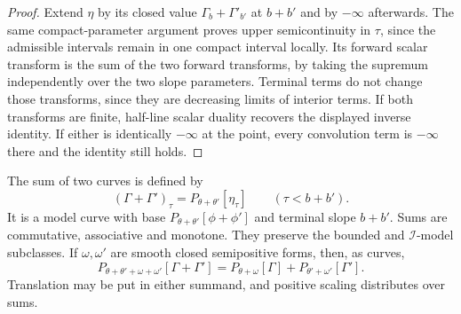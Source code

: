 \begin{proof}
Extend $\eta$ by its closed value $\Gamma_b+\Gamma'_{b'}$ at $b+b'$ and by $-\infty$ afterwards. The same compact-parameter argument proves upper semicontinuity in $\tau$, since the admissible intervals remain in one compact interval locally. Its forward scalar transform is the sum of the two forward transforms, by taking the supremum independently over the two slope parameters. Terminal terms do not change those transforms, since they are decreasing limits of interior terms. If both transforms are finite, half-line scalar duality recovers the displayed inverse identity. If either is identically $-\infty$ at the point, every convolution term is $-\infty$ there and the identity still holds.
\end{proof}

\begin{theorem}\label{thm:test-curve-sum}
The sum of two curves is defined by
\[
 (\Gamma+\Gamma')_\tau=P_{\theta+\theta'}[\eta_\tau]
                                      \qquad(\tau<b+b').
\]
It is a model curve with base $P_{\theta+\theta'}[\phi+\phi']$ and terminal slope $b+b'$. Sums are commutative, associative and monotone. They preserve the bounded and $\mathcal I$-model subclasses. If $\omega,\omega'$ are smooth closed semipositive forms, then, as curves,
\[
 P_{\theta+\theta'+\omega+\omega'}[\Gamma+\Gamma']
       =P_{\theta+\omega}[\Gamma]
                         +P_{\theta'+\omega'}[\Gamma'].
\]
Translation may be put in either summand, and positive scaling distributes over sums.
\end{theorem}
